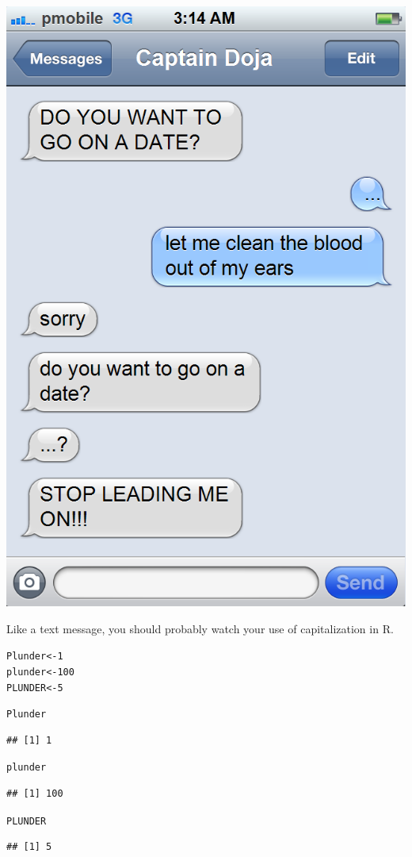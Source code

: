 \documentclass{tufte-book}\usepackage[]{graphicx}\usepackage[]{color}
\makeatletter
\newcommand{\hlnum}[1]{\textcolor[rgb]{0.686,0.059,0.569}{#1}}%
\newcommand{\hlstd}[1]{\textcolor[rgb]{0.345,0.345,0.345}{#1}}%
\newcommand{\hlkwb}[1]{\textcolor[rgb]{0.69,0.353,0.396}{#1}}%
\newenvironment{kframe}{%
 \def\at@end@of@kframe{}%
 \ifinner\ifhmode%
  \def\at@end@of@kframe{\end{minipage}}%
  \begin{minipage}{\columnwidth}%
 \fi\fi%
 \def\FrameCommand##1{\hskip\@totalleftmargin \hskip-\fboxsep
 \colorbox{shadecolor}{##1}\hskip-\fboxsep
     \hskip-\linewidth \hskip-\@totalleftmargin \hskip\columnwidth}%
 \MakeFramed {\advance\hsize-\width
   \@totalleftmargin\z@ \linewidth\hsize
   \@setminipage}}%
 {\par\unskip\endMakeFramed%
 \at@end@of@kframe}
\newenvironment{knitrout}{}{} %
\makeatother
\begin{document}
\begin{marginfigure}
\includegraphics[width=\linewidth]{datetext.png}
\caption{Like a text message, you should probably watch your use of capitalization in R.}
\end{marginfigure}


\begin{knitrout}
\color{fgcolor}\begin{kframe}
\begin{alltt}
\hlstd{Plunder} \hlkwb{<-} \hlnum{1}
\hlstd{plunder} \hlkwb{<-} \hlnum{100}
\hlstd{PLUNDER} \hlkwb{<-} \hlnum{5}

\hlstd{Plunder}
\end{alltt}
\begin{verbatim}
## [1] 1
\end{verbatim}
\begin{alltt}
\hlstd{plunder}
\end{alltt}
\begin{verbatim}
## [1] 100
\end{verbatim}
\begin{alltt}
\hlstd{PLUNDER}
\end{alltt}
\begin{verbatim}
## [1] 5
\end{verbatim}
\end{kframe}
\end{knitrout}
\end{document}
